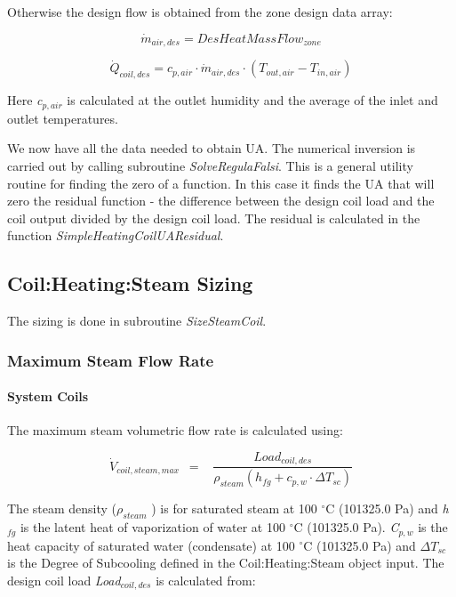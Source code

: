 Otherwise the design flow is obtained from the zone design data array:

\begin{equation}
\dot m_{air,des} = DesHeatMassFlow_{zone}
\end{equation}

\begin{equation}
\dot Q_{coil,des} = c_{p,air} \cdot \dot m_{air,des} \cdot (T_{out,air} - T_{in,air})
\end{equation}

Here \emph{c\(_{p,air}\)} is calculated at the outlet humidity and the average of the inlet and outlet temperatures.

We now have all the data needed to obtain UA. The numerical inversion is carried out by calling subroutine \emph{SolveRegulaFalsi}. This is a general utility routine for finding the zero of a function. In this case it finds the UA that will zero the residual function - the difference between the design coil load and the coil output divided by the design coil load. The residual is calculated in the function \emph{SimpleHeatingCoilUAResidual}.

\subsection{Coil:Heating:Steam Sizing}\label{coilheatingsteam-sizing}

The sizing is done in subroutine \emph{SizeSteamCoil}.

\subsubsection{Maximum Steam Flow Rate}\label{maximum-steam-flow-rate}

\paragraph{System Coils}\label{system-coils-2}

The maximum steam volumetric flow rate is calculated using:

\begin{equation}
{\dot V_{coil,steam,max}}\,\,\, = \,\,\,\,\,\frac{{Loa{d_{coil,des}}}}{{{\rho_{steam}}\left( {{h_{fg}} + {c_{p,w}}\cdot \Delta {T_{sc}}} \right)}}
\end{equation}

The steam density (\({\rho_{steam}}\) ) is for saturated steam at 100 \(^{\circ}\)C (101325.0 Pa) and \emph{h\(_{fg}\)} is the latent heat of vaporization of water at 100 \(^{\circ}\)C (101325.0 Pa). \emph{C\(_{p,w}\)} is the heat capacity of saturated water (condensate) at 100 \(^{\circ}\)C (101325.0 Pa) and \(\Delta {T_{sc}}\) is the Degree of Subcooling defined in the Coil:Heating:Steam object input. The design coil load \emph{Load\(_{coil,des}\)} is calculated from:

